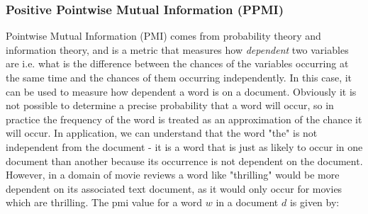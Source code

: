 \subsubsection{Positive Pointwise Mutual Information (PPMI)}








Pointwise Mutual Information (PMI) comes from probability theory and information theory, and is a metric that measures how \textit{dependent}  two variables are i.e. what is the difference between the chances of the variables occurring  at the same time and the chances of them occurring independently. In this case, it can be used to measure how dependent a word is on a document. Obviously it is not possible to determine a precise probability that a word will occur, so in practice the frequency of the word is treated as an approximation of the chance it will occur. In application, we can understand that the word "the" is not independent from the document - it is a word that is just as likely to occur in one document than another because its occurrence is not dependent on the document. However, in a domain of movie reviews a word like "thrilling" would be more dependent on its associated text document, as it would only occur for movies which are thrilling. The pmi value for a word $w$ in a document  $d$ is given by:


